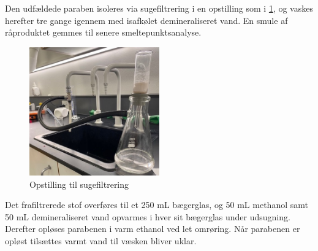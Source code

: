 \documentclass{report}
\begin{document}
Den udfældede paraben isoleres via sugefiltrering i en opstilling som i \cref{fig:sug}, og vaskes herefter tre gange igennem med isafkølet demineraliseret vand.
En smule af råproduktet gemmes til senere smeltepunktsanalyse.
\begin{figure}[H]
\begin{center}
  \includegraphics[width=0.5\textwidth]{sug.jpg}
\end{center}
\caption{Opstilling til sugefiltrering}
\label{fig:sug}
\end{figure}
Det frafiltrerede stof overføres til et 250 mL bægerglas, og 50 mL methanol samt 50 mL demineraliseret vand opvarmes i hver sit bægerglas under udsugning.
Derefter opløses parabenen i varm ethanol ved let omrøring.
Når parabenen er opløst tilsættes varmt vand til væsken bliver uklar.
\end{document}
